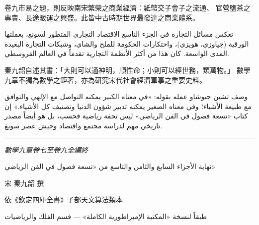 \documentclass[11pt,a4paper]{article}
\begin{document}
\vspace{0.5cm}

\noindent
\begin{minipage}[t]{0.48\textwidth}
卷九市易之題，則反映南宋繁榮之商業經濟：紙幣交子會子之流通、
官營鹽茶之專賣、長途販運之興盛。此皆中古時期世界最發達之商業體系。
\end{minipage}
\hfill
\begin{minipage}[t]{0.48\textwidth}
\arabicfont\beginR
تعكس مسائل التجارة في الجزء التاسع الاقتصاد التجاري المتطور لسونغ،
بعملتها الورقية (جياوزي، هويزي)، واحتكارات الحكومة للملح والشاي،
وشبكات التجارة البعيدة المدى الواسعة. كان هذا من أكثر الأنظمة
التجارية تقدماً في العالم القروسطي.
\endR
\end{minipage}

\vspace{0.5cm}

\noindent
\begin{minipage}[t]{0.48\textwidth}
秦九韶自述其書：「大則可以通神明，順性命；小則可以經世務，類萬物。」
數學九章不獨為數學之鉅著，亦為研究宋代社會經濟軍事之重要史料。
\end{minipage}
\hfill
\begin{minipage}[t]{0.48\textwidth}
\arabicfont\beginR
وصف تشين جيوشاو عمله بقوله: «في معناه الكبير يمكنه التواصل مع
الإلهي والتوافق مع طبيعة الأشياء؛ وفي معناه الصغير يمكنه تدبير
شؤون الدنيا وتصنيف كل الأشياء.» إن كتاب «تسعة فصول في الفن
الرياضي» ليس تحفة رياضية فحسب، بل هو أيضاً مصدر تاريخي مهم
لدراسة مجتمع واقتصاد وجيش عصر سونغ.
\endR
\end{minipage}

\vspace{2em}
\begin{center}
\rule{0.3\textwidth}{0.4pt}

\vspace{0.3cm}

{\large\itshape 數學九章卷七至卷九全編終}

\vspace{0.2cm}

{\arabicfont\beginR\large نهاية الأجزاء السابع والثامن والتاسع من «تسعة فصول في الفن الرياضي»\endR}

\vspace{0.3cm}

{\small 宋 \quad 秦九韶 \quad 撰}

\vspace{0.2cm}

{\small\color{notecolor} 依《欽定四庫全書》子部天文算法類本}

\vspace{0.2cm}

{\small\arabicfont\beginR\color{notecolor}
طبقاً لنسخة «المكتبة الإمبراطورية الكاملة» — قسم الفلك والرياضيات
\endR}
\end{center}
\end{document}

